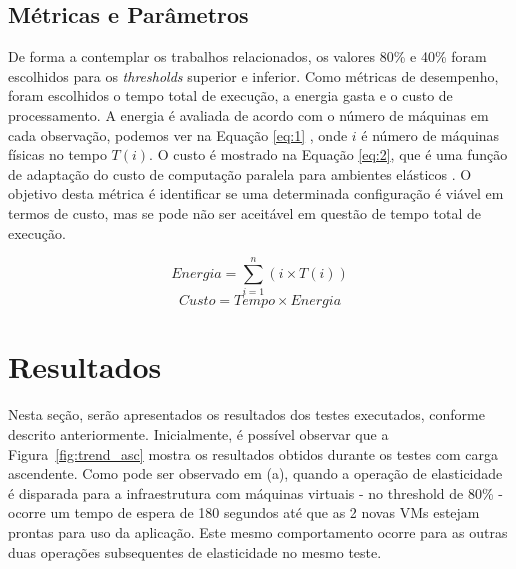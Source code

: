\documentclass[twoside,english,brazilian]{UNISINOSartigo}
\begin{document}
\subsection{Métricas e Parâmetros}

De forma a contemplar os trabalhos relacionados, os valores 80\% e 40\% foram escolhidos para os \textit{thresholds} superior e inferior. Como métricas de desempenho, foram escolhidos o tempo total de execução, a energia gasta e o custo de processamento. A energia é avaliada de acordo com o número de máquinas em cada observação, podemos ver na Equação \ref{eq:1} , onde \(i\) é número de máquinas físicas no tempo \(T(i)\).  O custo é mostrado na Equação \ref{eq:2}, que é uma função de adaptação do custo de computação paralela para ambientes elásticos \cite{Barry2004}. O objetivo desta métrica é identificar se uma determinada configuração é viável em termos de custo, mas se pode não ser aceitável em questão de tempo total de execução. 

\begin{equation}
\label{eq:1}
Energia = \sum_{i=1}^{n}{(i \times T(i))}
\end{equation}
\begin{equation}
\label{eq:2}
Custo = Tempo \times Energia
\end{equation}

\section{Resultados}
\label{avaliacao}
Nesta seção, serão apresentados os resultados dos testes executados, conforme descrito anteriormente. Inicialmente, é possível observar que a Figura~\ref{fig:trend_asc} mostra os resultados obtidos durante os testes com carga ascendente. Como pode ser observado em (a), quando a operação de elasticidade é disparada para a infraestrutura com máquinas virtuais - no threshold de 80\% - ocorre um tempo de espera de 180 segundos até que as 2 novas VMs estejam prontas para uso da aplicação. Este mesmo comportamento ocorre para as outras duas operações subsequentes de elasticidade no mesmo teste.
\end{document}
